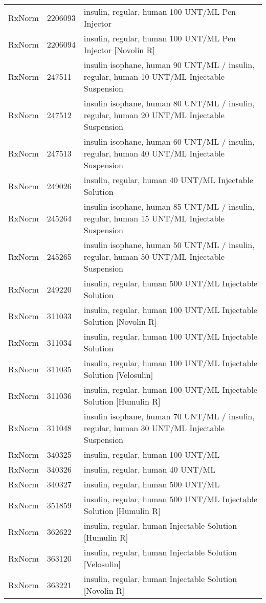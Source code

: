 \begin{longtable}{p{}p{}p{}}
  RxNorm & 2206093 & insulin, regular, human 100 UNT/ML Pen Injector \\ 
  RxNorm & 2206094 & insulin, regular, human 100 UNT/ML Pen Injector [Novolin R] \\ 
  RxNorm & 247511 & insulin isophane, human 90 UNT/ML / insulin, regular, human 10 UNT/ML Injectable Suspension \\ 
  RxNorm & 247512 & insulin isophane, human 80 UNT/ML / insulin, regular, human 20 UNT/ML Injectable Suspension \\ 
  RxNorm & 247513 & insulin isophane, human 60 UNT/ML / insulin, regular, human 40 UNT/ML Injectable Suspension \\ 
  RxNorm & 249026 & insulin, regular, human 40 UNT/ML Injectable Solution \\ 
  RxNorm & 245264 & insulin isophane, human 85 UNT/ML / insulin, regular, human 15 UNT/ML Injectable Suspension \\ 
  RxNorm & 245265 & insulin isophane, human 50 UNT/ML / insulin, regular, human 50 UNT/ML Injectable Suspension \\ 
  RxNorm & 249220 & insulin, regular, human 500 UNT/ML Injectable Solution \\ 
  RxNorm & 311033 & insulin, regular, human 100 UNT/ML Injectable Solution [Novolin R] \\ 
  RxNorm & 311034 & insulin, regular, human 100 UNT/ML Injectable Solution \\ 
  RxNorm & 311035 & insulin, regular, human 100 UNT/ML Injectable Solution [Velosulin] \\ 
  RxNorm & 311036 & insulin, regular, human 100 UNT/ML Injectable Solution [Humulin R] \\ 
  RxNorm & 311048 & insulin isophane, human 70 UNT/ML / insulin, regular, human 30 UNT/ML Injectable Suspension \\ 
  RxNorm & 340325 & insulin, regular, human 100 UNT/ML \\ 
  RxNorm & 340326 & insulin, regular, human 40 UNT/ML \\ 
  RxNorm & 340327 & insulin, regular, human 500 UNT/ML \\ 
  RxNorm & 351859 & insulin, regular, human 500 UNT/ML Injectable Solution [Humulin R] \\ 
  RxNorm & 362622 & insulin, regular, human Injectable Solution [Humulin R] \\ 
  RxNorm & 363120 & insulin, regular, human Injectable Solution [Velosulin] \\ 
  RxNorm & 363221 & insulin, regular, human Injectable Solution [Novolin R] \\ 

\end{longtable}
